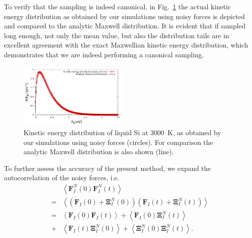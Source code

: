 \documentclass[format=acmsmall,urlbreakonhyphens]{acmart}
\begin{document}
To verify that the sampling is indeed canonical, in Fig.~\ref{Fig3} the actual kinetic energy distribution as obtained by our simulations using noisy forces is depicted and compared to the analytic Maxwell distribution. It is evident that if sampled long enough, not only the mean value, but also the distribution tails are in excellent agreement with the exact Maxwellian kinetic energy distribution, which demonstrates that we are indeed performing a canonical sampling.
\begin{figure}%
\begin{center}
\includegraphics[width=0.475\textwidth]
{figures/maxwelldistribution_new.pdf}
\end{center}
\caption{\label{Fig3}
Kinetic energy distribution of liquid Si at 3000~K, as obtained by our simulations using noisy forces (circles). For comparison the analytic Maxwell distribution is also shown (line).
} \end{figure}
To further assess the accuracy of the present method, we expand the autocorrelation of the noisy forces, i.e.
\begin{subequations}
\begin{eqnarray}
  && \left \langle \textbf{F}_{I}^{N}\left ( 0 \right )\textbf{F}_{I}^{N}\left ( t \right )\right \rangle \\
  &=& \left \langle \left ( \textbf{F}_{I}\left ( 0 \right ) + \mathbf{\Xi } _{I}^{N} \left(0 \right )\right) \left( \textbf{F}_{I}\left ( t \right )+\mathbf{\Xi } _{I}^{N}\left ( t \right )\right) \right \rangle \\
  &=& \left \langle \textbf{F}_{I}\left ( 0 \right ) \textbf{F}_{I}\left ( t \right )\right \rangle + \left \langle \textbf{F}_{I}\left ( 0 \right ) \mathbf{\Xi } _{I}^{N}\left(t \right )\right \rangle \label{AutoCorr} \\
  &+& \left \langle \textbf{F}_{I}\left ( t \right ) \mathbf{\Xi } _{I}^{N}\left(0 \right )\right \rangle + \left \langle \mathbf{\Xi } _{I}^{N}\left(0 \right ) \mathbf{\Xi } _{I}^{N}\left(t \right )\right \rangle.  \nonumber
\end{eqnarray}
\end{subequations}
\end{document}
